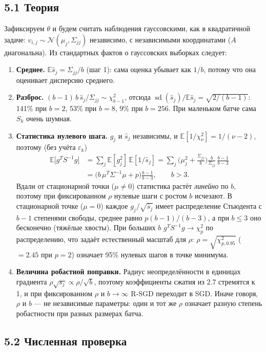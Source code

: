 \documentclass[11pt,a4paper]{article}
\newcommand{\E}{\mathbb{E}}
\begin{document}
\subsection*{5.1 Теория}

Зафиксируем $\theta$ и будем считать наблюдения гауссовскими, как в квадратичной задаче:
$v_{i,j}\sim\mathcal N(\mu_j,\Sigma_{jj})$ независимо, с независимыми координатами
($A$ диагональна). Из стандартных фактов о гауссовских выборках следует:
\begin{enumerate}
\item \textbf{Среднее.} $\E\widehat s_j=\Sigma_{jj}/b$ (шаг 1): сама оценка убывает как
$1/b$, потому что она оценивает дисперсию среднего.
\item \textbf{Разброс.} $(b-1)\,b\,\widehat s_j/\Sigma_{jj}\sim\chi^2_{b-1}$, отсюда
$\operatorname{sd}(\widehat s_j)/\E\widehat s_j=\sqrt{2/(b-1)}$: 141\% при $b=2$, 53\%
при $b=8$, 9\% при $b=256$. При маленьком батче сама $S_k$ очень шумная.
\item \textbf{Статистика нулевого шага.} $g_j$ и $\widehat s_j$ независимы, и
$\E[1/\chi^2_\nu]=1/(\nu-2)$, поэтому (без учёта $\varepsilon_k$)
\begin{align*}
\E\big[g^TS^{-1}g\big]&=\sum_j\E[g_j^2]\,\E[1/\widehat s_j]
=\sum_j\Big(\mu_j^2+\frac{\Sigma_{jj}}b\Big)\frac{b}{\Sigma_{jj}}\,\frac{b-1}{b-3}\\
&=\big(b\,\mu^T\Sigma^{-1}\mu+p\big)\frac{b-1}{b-3},\qquad b>3 .
\end{align*}
Вдали от стационарной точки ($\mu\ne0$) статистика растёт \emph{линейно} по $b$,
поэтому при фиксированном $\rho$ нулевые шаги с ростом $b$ исчезают. В стационарной
точке ($\mu=0$) каждое $g_j/\sqrt{\widehat s_j}$ имеет распределение Стьюдента с $b-1$
степенями свободы, среднее равно $p(b-1)/(b-3)$, а при $b\le3$ оно бесконечно (тяжёлые
хвосты). При больших $b$ $g^TS^{-1}g\to\chi^2_p$ по распределению, что задаёт
естественный масштаб для $\rho$: $\rho=\sqrt{\chi^2_{p,0.95}}$ ($=2.45$ при $p=2$)
означает 95\% нулевых шагов в точке минимума.
\item \textbf{Величина робастной поправки.} Радиус неопределённости в единицах
градиента $\rho\sqrt{s_j}\propto\rho/\sqrt b$, поэтому коэффициенты сжатия из 2.7
стремятся к 1, и при фиксированном $\rho$ и $b\to\infty$ R-SGD переходит в SGD. Иначе
говоря, $\rho$ и $b$ — не независимые параметры: один и тот же $\rho$ означает разную
степень робастности при разных размерах батча.
\end{enumerate}

\subsection*{5.2 Численная проверка}
\end{document}
